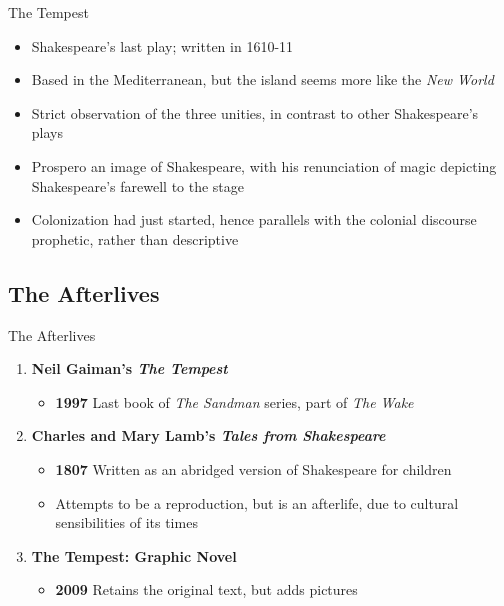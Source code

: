 \documentclass{beamer}
\begin{document}
\begin{frame}{The Tempest ~\cite{tempest}}
  \begin{itemize}
    \item Shakespeare's last play; written in 1610-11
    \item Based in the Mediterranean, but the island seems more like the \emph{New World}
    \item Strict observation of the three unities, in contrast to other Shakespeare's plays 
    \item Prospero an image of Shakespeare, with his renunciation of magic depicting Shakespeare's farewell to the stage
    \item Colonization had just started, hence parallels with the colonial discourse prophetic, rather than descriptive
  \end{itemize}
\end{frame}

\subsection{The Afterlives}
\begin{frame}{The Afterlives}
  \begin{enumerate}
  \item \textbf{Neil Gaiman's \emph{The Tempest}}~\cite{gaimantempest}
    \begin{itemize}
    \item \textbf{1997} Last book of \emph{The Sandman} series, part of \emph{The Wake}
    \end{itemize}
  \item \textbf{Charles and Mary Lamb's \emph{Tales from Shakespeare} }~\cite{lamb}
    \begin{itemize}
    \item \textbf{1807} Written as an abridged version of Shakespeare for children
    \item Attempts to be a reproduction, but is an afterlife, due to cultural sensibilities of its times
    \end{itemize}
  \item \textbf{The Tempest: Graphic Novel}~\cite{tempestgraphicnovel}
    \begin{itemize}
    \item \textbf{2009} Retains the original text, but adds pictures
    \end{itemize}
  \end{enumerate}
\end{frame}
\end{document}
